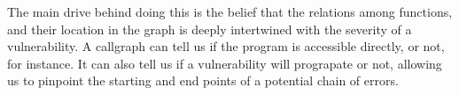 The main drive behind doing this is the belief that the relations among functions, and their location in the graph is deeply intertwined with the severity of a vulnerability. A callgraph can tell us if the program is accessible directly, or not, for instance. It can also tell us if a vulnerability will prograpate or not, allowing us to pinpoint the starting and end points of a potential chain of errors.



